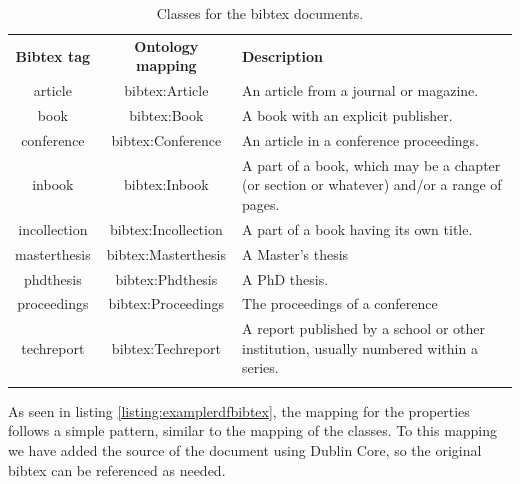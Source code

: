 \begin{center}
  \begin{table}
    \begin{tabular*}{0.7\textwidth}{@{\extracolsep{\fill}} | c | c | p{} |}
      \hhline{|-|-|-|}
      \textbf{Bibtex tag} & \textbf{Ontology mapping} & \textbf{Description} \\ \hhline{|=|=|=|}
      article & bibtex:Article & An article from a journal or magazine. \\ \hhline{|-|-|-|}
      book & bibtex:Book & A book with an explicit publisher. \\ \hhline{|-|-|-|}
      conference & bibtex:Conference & An article in a conference proceedings. \\ \hhline{|-|-|-|}
      inbook & bibtex:Inbook & A part of a book, which may be a chapter (or section or whatever) and/or a range of pages. \\ \hhline{|-|-|-|}
      incollection & bibtex:Incollection & A part of a book having its own title. \\ \hhline{|-|-|-|}
      masterthesis & bibtex:Masterthesis & A Master's thesis \\ \hhline{|-|-|-|}
      phdthesis & bibtex:Phdthesis & A PhD thesis. \\ \hhline{|-|-|-|}
      proceedings & bibtex:Proceedings & The proceedings of a conference \\ \hhline{|-|-|-|}
      techreport & bibtex:Techreport & A report published by a school or other institution, usually numbered within a series. \\ \hhline{|-|-|-|}
      \end{tabular*}
    \caption{Classes for the bibtex documents.}
    \label{tab:bibtex-classes}
  \end{table}
\end{center}

As seen in listing \ref{listing:examplerdfbibtex}, the mapping for the properties follows a simple pattern, similar to the mapping of the classes. To this mapping we have added the source of the document using Dublin Core, so the original bibtex can be referenced as needed.

